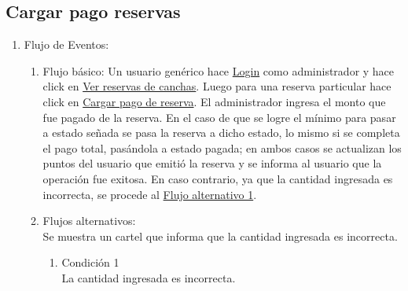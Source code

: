 \documentclass[a4paper,11pt]{article}
\begin{document}

\subsection{Cargar pago reservas}
\begin{enumerate}


    \begin{enumerate}
    \item Descripción breve: \\
        Se carga un pago para una determinada reserva.
    \item Actores \\
        Administrador.
    \item Disparadores: \\
        Click en el botón \underline{Cargar pago de reserva} dentro de la
        página que muestra las reservas para una cancha.
    \end{enumerate}

    \item Flujo de Eventos: 

    \begin{enumerate}

        \item Flujo básico:
            Un usuario genérico hace \underline{Login} como administrador y
            hace click en \underline{Ver reservas de canchas}. Luego para una
            reserva particular hace click en
            \underline{Cargar pago de reserva}. El administrador ingresa el
            monto que fue pagado de la reserva. En el caso de que se logre el
            mínimo para pasar a estado señada se pasa la reserva a dicho
            estado, lo mismo si se completa el pago total, pasándola a estado
            pagada; en ambos casos se actualizan los puntos del usuario que
            emitió la reserva y se informa al usuario que la operación fue
            exitosa. En caso contrario, ya que la cantidad ingresada es
            incorrecta, se procede al \underline{Flujo alternativo 1}. 


        \item Flujos alternativos:\\
            Se muestra un cartel que informa que la cantidad ingresada es
            incorrecta.
            \begin{enumerate}
                \item Condición 1 \\
                    La cantidad ingresada es incorrecta.
            \end{enumerate}


\end{enumerate}
\end{enumerate}
\end{document}
